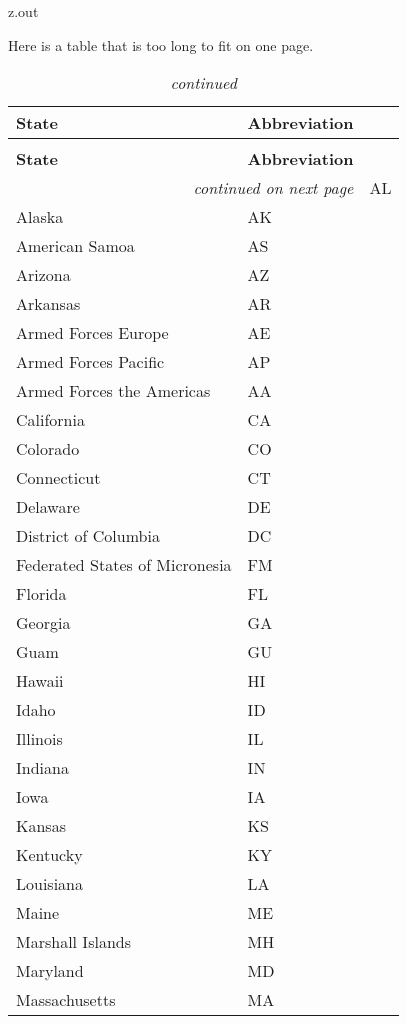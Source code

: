 \begin{VerbatimOut}{z.out}

\newpage

Here is a table that is too long to fit on one page.

\begin{longtable}{@{}ll@{}}
    \caption{State Abbreviations}\\
    \toprule
    \bf State& \bf Abbreviation\\
    \hline
  \endfirsthead
    \caption[]{\emph{continued}}\\
    \midrule
    \bf State& \bf Abbreviation\\
    \midrule
  \endhead
    \hline
    \multicolumn{2}{r}{\emph{continued on next page}}
  \endfoot
    \bottomrule
  \endlastfoot
  Alabama& AL\\
  Alaska& AK\\
  American Samoa& AS\\
  Arizona& AZ\\
  Arkansas& AR\\
  Armed Forces Europe& AE\\
  Armed Forces Pacific& AP\\
  Armed Forces the Americas& AA\\
  California& CA\\
  Colorado& CO\\
  Connecticut& CT\\
  Delaware& DE\\
  District of Columbia& DC\\
  Federated States of Micronesia& FM\\
  Florida& FL\\
  Georgia& GA\\
  Guam& GU\\
  Hawaii& HI\\
  Idaho& ID\\
  Illinois& IL\\
  Indiana& IN\\
  Iowa& IA\\
  Kansas& KS\\
  Kentucky& KY\\
  Louisiana& LA\\
  Maine& ME\\
  Marshall Islands& MH\\
  Maryland& MD\\
  Massachusetts& MA\\

\end{longtable}
\end{VerbatimOut}
